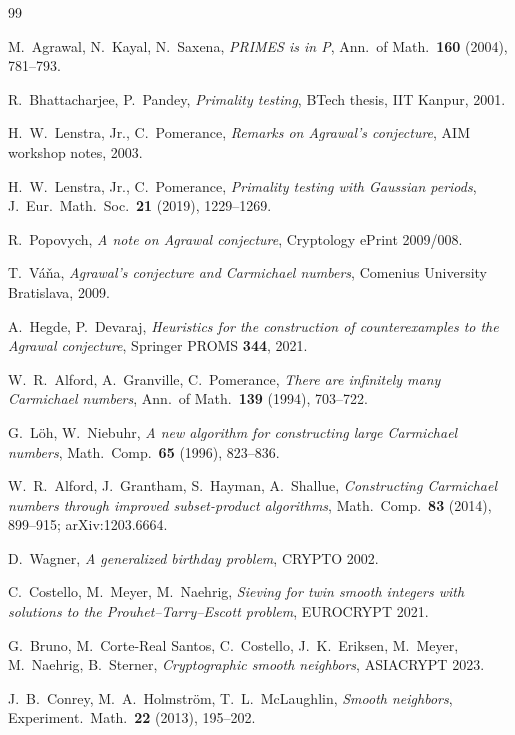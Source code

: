 \documentclass[11pt]{article}
\theoremstyle{remark}
\begin{document}
\begin{thebibliography}{99}\itemsep1pt\small

 M.~Agrawal, N.~Kayal, N.~Saxena, \emph{PRIMES is in P},
Ann.\ of Math.\ \textbf{160} (2004), 781--793.

 R.~Bhattacharjee, P.~Pandey, \emph{Primality testing},
BTech thesis, IIT Kanpur, 2001.

 H.~W.~Lenstra, Jr., C.~Pomerance, \emph{Remarks on
Agrawal's conjecture}, AIM workshop notes, 2003.

 H.~W.~Lenstra, Jr., C.~Pomerance, \emph{Primality testing
with Gaussian periods}, J.\ Eur.\ Math.\ Soc.\ \textbf{21} (2019),
1229--1269.

 R.~Popovych, \emph{A note on Agrawal conjecture},
Cryptology ePrint 2009/008.

 T.~V\'a\v{n}a, \emph{Agrawal's conjecture and Carmichael
numbers}, Comenius University Bratislava, 2009.

 A.~Hegde, P.~Devaraj, \emph{Heuristics for the construction
of counterexamples to the Agrawal conjecture}, Springer PROMS
\textbf{344}, 2021.

 W.~R.~Alford, A.~Granville, C.~Pomerance, \emph{There are
infinitely many Carmichael numbers}, Ann.\ of Math.\ \textbf{139} (1994),
703--722.

 G.~L\"oh, W.~Niebuhr, \emph{A new algorithm for constructing
large Carmichael numbers}, Math.\ Comp.\ \textbf{65} (1996), 823--836.

 W.~R.~Alford, J.~Grantham, S.~Hayman, A.~Shallue,
\emph{Constructing Carmichael numbers through improved subset-product
algorithms}, Math.\ Comp.\ \textbf{83} (2014), 899--915; arXiv:1203.6664.

 D.~Wagner, \emph{A generalized birthday problem},
CRYPTO 2002.

 C.~Costello, M.~Meyer, M.~Naehrig, \emph{Sieving for twin
smooth integers with solutions to the Prouhet--Tarry--Escott problem},
EUROCRYPT 2021.

 G.~Bruno, M.~Corte-Real Santos, C.~Costello,
J.~K.~Eriksen, M.~Meyer, M.~Naehrig, B.~Sterner, \emph{Cryptographic
smooth neighbors}, ASIACRYPT 2023.

 J.~B.~Conrey, M.~A.~Holmstr\"om, T.~L.~McLaughlin,
\emph{Smooth neighbors}, Experiment.\ Math.\ \textbf{22} (2013), 195--202.


\end{thebibliography}
\end{document}
